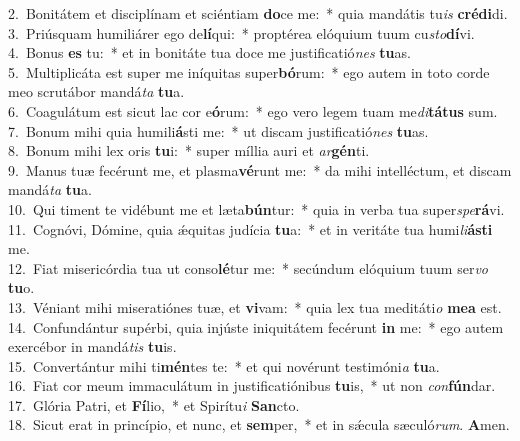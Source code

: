 {2.~}Bonitátem et disciplínam et sciéntiam \textbf{do}ce me:~* quia mandátis tu\textit{is} \textbf{cré}\textbf{di}di.\\
{3.~}Priúsquam humiliárer ego de\textbf{lí}qui:~* proptérea elóquium tuum cu\textit{sto}\textbf{dí}vi.\\
{4.~}Bonus \textbf{es} tu:~* et in bonitáte tua doce me justificatió\textit{nes} \textbf{tu}as.\\
{5.~}Multiplicáta est super me iníquitas super\textbf{bó}rum:~* ego autem in toto corde meo scrutábor mandá\textit{ta} \textbf{tu}a.\\
{6.~}Coagulátum est sicut lac cor e\textbf{ó}rum:~* ego vero legem tuam me\textit{di}\textbf{tá}\textbf{tus} sum.\\
{7.~}Bonum mihi quia humili\textbf{á}sti me:~* ut discam justificatió\textit{nes} \textbf{tu}as.\\
{8.~}Bonum mihi lex oris \textbf{tu}i:~* super míllia auri et \textit{ar}\textbf{gén}ti.\\
{9.~}Manus tuæ fecérunt me, et plasma\textbf{vé}runt me:~* da mihi intelléctum, et discam mandá\textit{ta} \textbf{tu}a.\\
{10.~}Qui timent te vidébunt me et læta\textbf{bún}tur:~* quia in verba tua super\textit{spe}\textbf{rá}vi.\\
{11.~}Cognóvi, Dómine, quia ǽquitas judícia \textbf{tu}a:~* et in veritáte tua humi\textit{li}\textbf{á}\textbf{sti} me.\\
{12.~}Fiat misericórdia tua ut conso\textbf{lé}tur me:~* secúndum elóquium tuum ser\textit{vo} \textbf{tu}o.\\
{13.~}Véniant mihi miseratiónes tuæ, et \textbf{vi}vam:~* quia lex tua meditáti\textit{o} \textbf{me}\textbf{a} est.\\
{14.~}Confundántur supérbi, quia injúste iniquitátem fecérunt \textbf{in} me:~* ego autem exercébor in mandá\textit{tis} \textbf{tu}is.\\
{15.~}Convertántur mihi ti\textbf{mén}tes te:~* et qui novérunt testimóni\textit{a} \textbf{tu}a.\\
{16.~}Fiat cor meum immaculátum in justificatiónibus \textbf{tu}is,~* ut non \textit{con}\textbf{fún}dar.\\
{17.~}Glória Patri, et \textbf{Fí}lio,~* et Spirítu\textit{i} \textbf{San}cto.\\
{18.~}Sicut erat in princípio, et nunc, et \textbf{sem}per,~* et in sǽcula sæculó\textit{rum}. \textbf{A}men.\\
